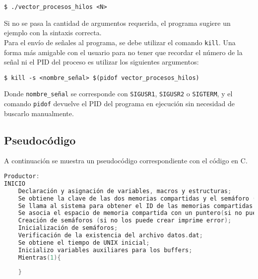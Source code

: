 \begin{center}
    \texttt{\$ ./vector\_procesos\_hilos <N>}
\end{center}

Si no se pasa la cantidad de argumentos requerida, el programa sugiere un ejemplo con la sintaxis correcta.\\

Para el envío de señales al programa, se debe utilizar el comando \texttt{kill}. Una forma más amigable con el usuario para no tener que recordar el número de la señal ni el PID del proceso es utilizar los siguientes argumentos:

\begin{center}
    \texttt{\$ kill -s <nombre\_señal>\ \$(pidof vector\_procesos\_hilos)}
\end{center}

Donde \texttt{nombre\_señal} se corresponde con \texttt{SIGUSR1}, \texttt{SIGUSR2} o \texttt{SIGTERM}, y el comando \texttt{pidof} devuelve el PID del programa en ejecución sin necesidad de buscarlo manualmente.\\

\subsection{Pseudocódigo}

A continuación se muestra un pseudocódigo correspondiente con el código en C.\\

\begin{lstlisting}[language=C]
Productor:
INICIO
    Declaración y asignación de variables, macros y estructuras;
    Se obtiene la clave de las dos memorias compartidas y el semáforo (en el caso de que no las obtenga imprime error);
    Se llama al sistema para obtener el ID de las memorias compartidas (en el caso de que no las obtenga imprime error);
    Se asocia el espacio de memoria compartida con un puntero(si no puede asociar imprime error);
    Creación de semáforos (si no los puede crear imprime error);
    Inicialización de semáforos;
    Verificación de la existencia del archivo datos.dat;
    Se obtiene el tiempo de UNIX inicial;
    Inicializo variables auxiliares para los buffers;
    Mientras(1){
	
    }


\end{lstlisting}